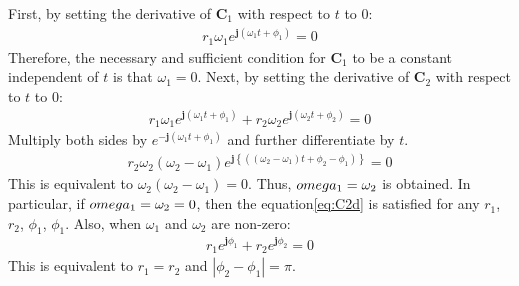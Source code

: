 \documentclass[tombow,dvipdfmx]{corona-a5-1.1}
\begin{document}
\begin{証明}
First, by setting the derivative of $\bm{C}_1$ with respect to $t$ to 0:
\begin{align*}
r_1 \omega_1 e^{ \bm{j} (\omega_1 t + \phi_1)}=0
\end{align*}
Therefore, the necessary and sufficient condition for $\bm{C}_1$ to be a constant independent of $t$ is that $\omega_1=0$.
Next, by setting the derivative of $\bm{C}_2$ with respect to $t$ to 0:
\begin{align}\label{eq:C2d}
r_1 \omega_1 e^{ \bm{j} (\omega_1 t + \phi_1)}
+ r_2 \omega_2 e^{ \bm{j} (\omega_2 t + \phi_2)}=0
\end{align}
Multiply both sides by $e^{ -\bm{j} (\omega_1 t + \phi_1)}$ and further differentiate by $t$.
\begin{align*}
r_2 \omega_2 (\omega_2-\omega_1)
e^{ \bm{j} \left\{( 
(\omega_2-\omega_1) t + \phi_2 - \phi_1)
\right\}
}=0
\end{align*}
This is equivalent to $\omega_2 (\omega_2-\omega_1)=0$.
Thus, $\\omega_1 =\omega_2$ is obtained.
In particular, if $\\omega_1=\omega_2=0$, then the equation\ref{eq:C2d} is satisfied for any $r_1$, $r_2$, $\phi_1$, $\phi_1$.
Also, when $\omega_1$ and $\omega_2$ are non-zero:
\begin{align*}
r_1 e^{ \bm{j} \phi_1} + r_2 e^{ \bm{j} \phi_2} =0
\end{align*}
This is equivalent to $r_1=r_2$ and $|\phi_2-\phi_1| = \pi$.


\end{証明}
\end{document}
